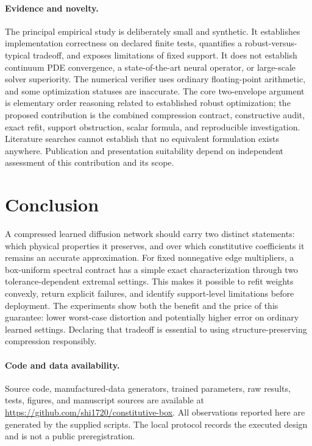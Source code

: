 \documentclass[11pt]{article}
\begin{document}
\paragraph{Evidence and novelty.}
The principal empirical study is deliberately small and synthetic. It establishes implementation correctness on declared finite tests, quantifies a robust-versus-typical tradeoff, and exposes limitations of fixed support. It does not establish continuum PDE convergence, a state-of-the-art neural operator, or large-scale solver superiority. The numerical verifier uses ordinary floating-point arithmetic, and some optimization statuses are inaccurate. The core two-envelope argument is elementary order reasoning related to established robust optimization; the proposed contribution is the combined compression contract, constructive audit, exact refit, support obstruction, scalar formula, and reproducible investigation. Literature searches cannot establish that no equivalent formulation exists anywhere. Publication and presentation suitability depend on independent assessment of this contribution and its scope.

\section{Conclusion}
A compressed learned diffusion network should carry two distinct statements: which physical properties it preserves, and over which constitutive coefficients it remains an accurate approximation. For fixed nonnegative edge multipliers, a box-uniform spectral contract has a simple exact characterization through two tolerance-dependent extremal settings. This makes it possible to refit weights convexly, return explicit failures, and identify support-level limitations before deployment. The experiments show both the benefit and the price of this guarantee: lower worst-case distortion and potentially higher error on ordinary learned settings. Declaring that tradeoff is essential to using structure-preserving compression responsibly.

\paragraph{Code and data availability.}
Source code, manufactured-data generators, trained parameters, raw results, tests, figures, and manuscript sources are available at \url{https://github.com/shi1720/constitutive-box}. All observations reported here are generated by the supplied scripts. The local protocol records the executed design and is not a public preregistration.
\end{document}
